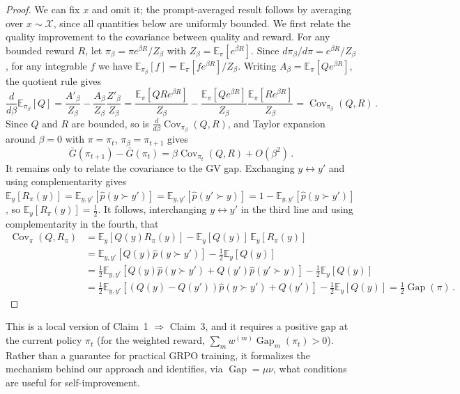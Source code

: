 \documentclass{article}
\theoremstyle{plain}
\theoremstyle{definition}
\theoremstyle{remark}
\DeclareMathOperator{\Cov}{Cov}
\DeclareMathOperator{\gap}{Gap}
\begin{document}
\begin{proof}
We can fix $x$ and omit it; the prompt-averaged result follows by averaging over $x\sim\mathcal{X}$, since all quantities below are uniformly bounded. We first relate the quality improvement to the covariance between quality and reward. For any bounded reward $R$, let $\pi_\beta=\pi e^{\beta R}/Z_\beta$ with $Z_\beta=\mathbb{E}_\pi[e^{\beta R}]$. Since $d\pi_\beta/d\pi=e^{\beta R}/Z_\beta$, for any integrable $f$ we have $\mathbb{E}_{\pi_\beta}[f]=\mathbb{E}_\pi[fe^{\beta R}]/Z_\beta$. Writing $A_\beta=\mathbb{E}_\pi[Qe^{\beta R}]$, the quotient rule gives
\[
  \frac{d}{d\beta}\mathbb{E}_{\pi_\beta}[Q]=\frac{A'_\beta}{Z_\beta}-\frac{A_\beta}{Z_\beta}\frac{Z'_\beta}{Z_\beta}=\frac{\mathbb{E}_\pi[QRe^{\beta R}]}{Z_\beta}-\frac{\mathbb{E}_\pi[Qe^{\beta R}]}{Z_\beta}\frac{\mathbb{E}_\pi[Re^{\beta R}]}{Z_\beta}=\Cov_{\pi_\beta}(Q,R)\,.
\]
Since $Q$ and $R$ are bounded, so is $\frac{d}{d\beta}\Cov_{\pi_\beta}(Q,R)$, and Taylor expansion around $\beta=0$ with $\pi=\pi_t$, $\pi_\beta=\pi_{t+1}$ gives
\[
  \bar{G}(\pi_{t+1})-\bar{G}(\pi_t)=\beta\Cov_{\pi_t}(Q,R)+O(\beta^2)\,.
\]
It remains only to relate the covariance to the GV gap. Exchanging $y\leftrightarrow y'$ and using complementarity gives $\mathbb{E}_y[R_\pi(y)]=\mathbb{E}_{y,y'}[\hat{p}(y\succ y')]=\mathbb{E}_{y,y'}[\hat{p}(y'\succ y)]=1-\mathbb{E}_{y,y'}[\hat{p}(y\succ y')]$, so $\mathbb{E}_y[R_\pi(y)]=\frac12$. It follows, interchanging $y\leftrightarrow y'$ in the third line and using complementarity in the fourth, that
\begin{align*}
  \Cov_\pi(Q,R_\pi)&=\mathbb{E}_y[Q(y)R_\pi(y)]-\mathbb{E}_y[Q(y)]\,\mathbb{E}_y[R_\pi(y)]\\
  &=\mathbb{E}_{y,y'}[Q(y)\hat{p}(y\succ y')]-\tfrac12\mathbb{E}_y[Q(y)]\\
  &=\tfrac12\mathbb{E}_{y,y'}[Q(y)\hat{p}(y\succ y')+Q(y')\hat{p}(y'\succ y)]-\tfrac12\mathbb{E}_y[Q(y)]\\
  &=\tfrac12\mathbb{E}_{y,y'}[(Q(y)-Q(y'))\hat{p}(y\succ y')+Q(y')]-\tfrac12\mathbb{E}_y[Q(y)]=\tfrac12\gap(\pi)\,.
\end{align*}
\end{proof}

This is a local version of Claim~1 $\Rightarrow$ Claim~3, and it requires a positive gap at the current policy $\pi_t$ (for the weighted reward, $\sum_m w^{(m)}\gap_m(\pi_t)>0$). Rather than a guarantee for practical GRPO training, it formalizes the mechanism behind our approach and identifies, via $\gap=\mu\nu$, what conditions are useful for self-improvement.
\end{document}
